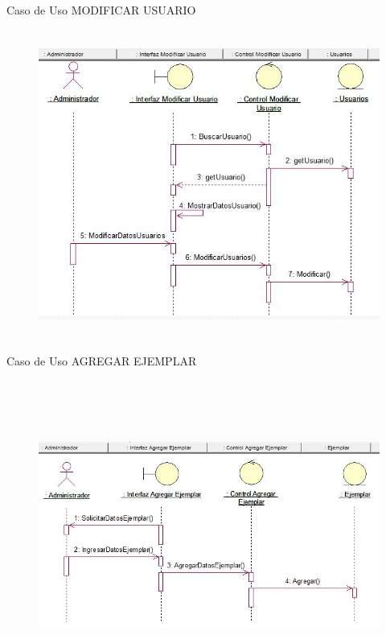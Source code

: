 \documentclass[12pt]{article}
\begin{document}
\begin{enumerate}[label*=\arabic*.]
\begin{enumerate}[label*=\arabic*.]
\begin{itemize}
\newpage

Caso de Uso MODIFICAR USUARIO
\begin{figure}[H]
	\begin{Center}
		\includegraphics[width=6in,height=4in]{./media/DSmodificarUsu.jpg}
	\end{Center}
\end{figure}

\vspace{\baselineskip}

Caso de Uso AGREGAR EJEMPLAR
\begin{figure}[H]
	\begin{Center}
		\includegraphics[width=6in,height=4in]{./media/DSagregarEjemplar.jpg}
	\end{Center}
\end{figure}


\end{itemize}
\end{enumerate}
\end{enumerate}
\end{document}
